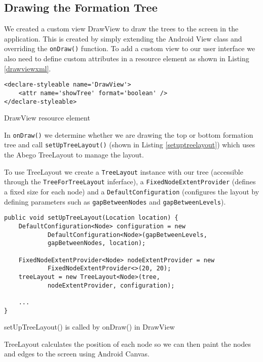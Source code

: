 \documentclass{report}
\begin{document}
\subsection{Drawing the Formation Tree}

We created a custom view DrawView to draw the trees to the screen in the application. This is created by simply extending the Android View class and overriding the {\tt onDraw()} function. To add a custom view to our user interface we also need to define custom attributes in a resource element as shown in Listing \ref{drawviewxml}.

\begin{listing}[ht]
\begin{verbatim}
<declare-styleable name='DrawView'>
    <attr name='showTree' format='boolean' />
</declare-styleable>
\end{verbatim}
\caption{DrawView resource element}
\label{drawviewxml}
\end{listing}

In {\tt onDraw()} we determine whether we are drawing the top or bottom formation tree and call {\tt setUpTreeLayout()} (shown in Listing \ref{setuptreelayout}) which uses the Abego TreeLayout to manage the layout.

To use TreeLayout we create a {\tt TreeLayout} instance with our tree (accessible through the {\tt TreeForTreeLayout} inferface), a {\tt FixedNodeExtentProvider} (defines a fixed size for each node) and a {\tt DefaultConfiguration} (configures the layout by defining parameters such as {\tt gapBetweenNodes} and {\tt gapBetweenLevels}).

\begin{listing}[ht]
\begin{verbatim}
public void setUpTreeLayout(Location location) {
    DefaultConfiguration<Node> configuration = new 
            DefaultConfiguration<Node>(gapBetweenLevels, 
            gapBetweenNodes, location);

    FixedNodeExtentProvider<Node> nodeExtentProvider = new 
            FixedNodeExtentProvider<>(20, 20);
    treeLayout = new TreeLayout<Node>(tree,
            nodeExtentProvider, configuration);

    ...
}
\end{verbatim}
\caption{setUpTreeLayout() is called by onDraw() in DrawView}
\label{setuptreelayout}
\end{listing}

TreeLayout calculates the position of each node so we can then paint the nodes and edges to the screen using Android Canvas.
\end{document}
